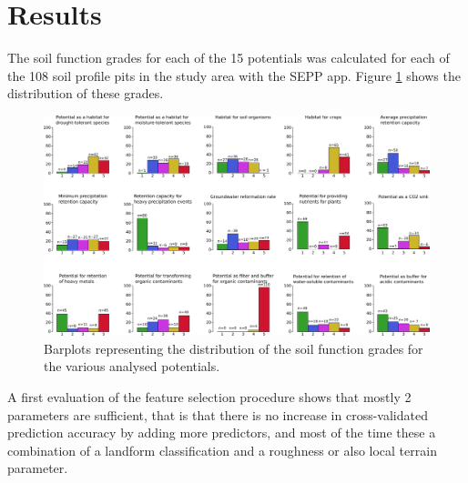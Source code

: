 \documentclass[preprint,12pt,authoryear]{elsarticle}
\begin{document}
\section{Results}
The soil function grades for each of the 15 potentials was calculated for each of the 108 soil profile pits in the study area with the SEPP app. Figure \ref{fig:SFdistro} shows the distribution of these grades.
 \begin{figure}[ht!]
\includegraphics[width=\textwidth,angle=0]{soilfunctiondistro.pdf}
\caption{Barplots representing the distribution of the soil function grades for the various analysed potentials. }
\label{fig:SFdistro}
\end{figure}
A first evaluation of the feature selection procedure shows that mostly 2 parameters are sufficient, that is that there is no increase in cross-validated prediction accuracy  by adding more predictors, and most of the time these a combination of a landform classification and a roughness or also local terrain parameter.
\end{document}

